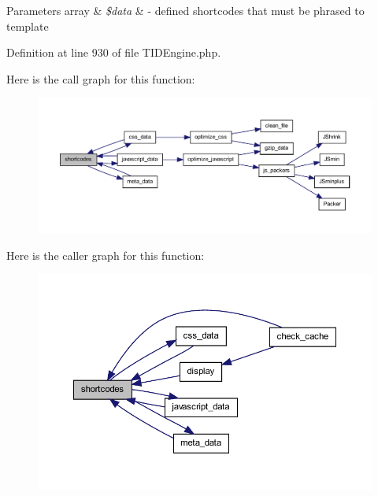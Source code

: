 \begin{DoxyParams}[1]{Parameters}
array & {\em \$data} & -\/ defined shortcodes that must be phrased to template \\
\hline
\end{DoxyParams}


Definition at line 930 of file TIDEngine.php.



Here is the call graph for this function:\nopagebreak
\begin{figure}[H]
\begin{center}
\leavevmode
\includegraphics[width=400pt]{class_t_i_d_engine_aea13c262e2b03850c680ec85a0011624_cgraph}
\end{center}
\end{figure}




Here is the caller graph for this function:\nopagebreak
\begin{figure}[H]
\begin{center}
\leavevmode
\includegraphics[width=374pt]{class_t_i_d_engine_aea13c262e2b03850c680ec85a0011624_icgraph}
\end{center}
\end{figure}



